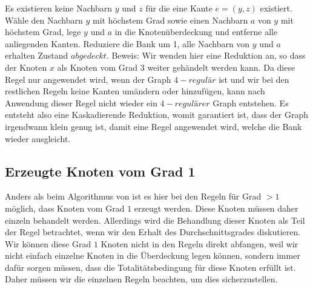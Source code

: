 \documentclass[12pt,onecolumn, notitlepage]{scrartcl}
\begin{document}
Es existieren keine Nachbarn $y$ und $z$ für die eine Kante $e = (y,z)$ existiert. Wähle den Nachbarn $y$ mit höchstem Grad sowie einen Nachbarn $a$ von $y$ mit höchstem Grad, lege $y$ und $a$ in die Knotenüberdeckung und entferne alle anliegenden Kanten. Reduziere die Bank um 1, alle Nachbarn von $y$ und $a$ erhalten Zustand $abgedeckt$. \newline
Beweis: Wir wenden hier eine Reduktion an, so dass der Knoten $x$ als Knoten vom Grad $3$ weiter gehändelt werden kann. Da diese Regel nur angewendet wird, wenn der Graph $4-regulär$ ist und wir bei den restlichen Regeln keine Kanten umändern oder hinzufügen, kann nach Anwendung dieser Regel nicht wieder ein $4-regulärer$ Graph entstehen. Es entsteht also eine Kaskadierende Reduktion, womit garantiert ist, dass der Graph irgendwann klein genug ist, damit eine Regel angewendet wird, welche die Bank wieder ausgleicht.\newline\newline
\subsection{Erzeugte Knoten vom Grad 1} 
Anders als beim Algorithmus von \cite{BraFer} ist es hier bei den Regeln für Grad $>1$ möglich, dass Knoten vom Grad $1$ erzeugt werden. Diese Knoten müssen daher einzeln behandelt werden. Allerdings wird die Behandlung dieser Knoten als Teil der Regel betrachtet, wenn wir den Erhalt des Durchschnittsgrades diskutieren. \newline
Wir können diese Grad $1$ Knoten nicht in den Regeln direkt abfangen, weil wir nicht einfach einzelne Knoten in die Überdeckung legen können, sondern immer dafür sorgen müssen, dass die Totalitätsbedingung für diese Knoten erfüllt ist. Daher müssen wir die einzelnen Regeln beachten, um dies sicherzustellen. \newline
\end{document}
